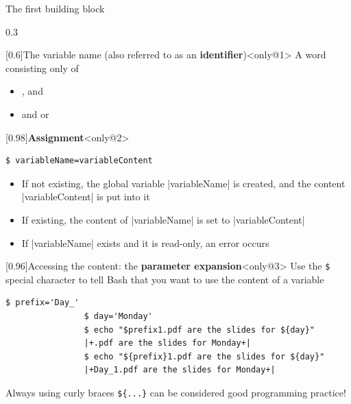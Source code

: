 \begin{frame}[fragile]{The first building block}
    \begin{overlayarea}{\textwidth}{0.3\textheight}
        \vspace{-4mm}
        \begin{varblock*}{}[0.6\textwidth]{The variable name (also referred to as an \textbf{identifier})}<only@1>
            A word consisting only of
            \begin{itemize}
                \item {},  and 
                \item and  or 
            \end{itemize}
        \end{varblock*}
        \begin{varblock*}{}[0.98\textwidth]{\textbf{Assignment}}<only@2>
            \begin{lstlisting}[style=MyBash, numbers=none, aboveskip=2mm, belowskip=-5mm, xrightmargin=26mm, xleftmargin=26mm]
                $ variableName=variableContent
            \end{lstlisting}
            \begin{itemize}
                \item If not existing, the \alert{global} variable \bash|variableName| is created, and the content \bash|variableContent| is put into it
                \item If existing, the content of \bash|variableName| is set to \bash|variableContent|
                \item If \bash|variableName| exists and it is read-only, an error occurs
            \end{itemize}
        \end{varblock*}
        \begin{varblock}{}[0.96\textwidth]{Accessing the content: the \textbf{parameter expansion}}<only@3>
            Use the \texttt{\$} special character to tell Bash that you want to use the content of a variable
            \begin{lstlisting}[style=MyBash, numbers=none, aboveskip=3mm, belowskip=-4mm]
                $ prefix='Day_'
                $ day='Monday'
                $ echo "$prefix1.pdf are the slides for ${day}"
                |+.pdf are the slides for Monday+|
                $ echo "${prefix}1.pdf are the slides for ${day}"
                |+Day_1.pdf are the slides for Monday+|
            \end{lstlisting}
            \alert{Always} using curly braces \alert{\texttt{\$\{...\}}} can be considered \alert{good programming practice}!

\end{varblock}
\end{overlayarea}
\end{frame}
